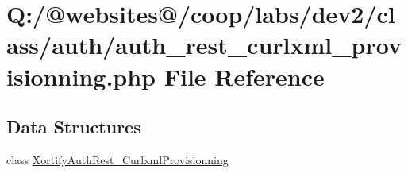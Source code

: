 \hypertarget{auth__rest__curlxml__provisionning_8php}{\section{Q\-:/@websites@/coop/labs/dev2/class/auth/auth\-\_\-rest\-\_\-curlxml\-\_\-provisionning.php File Reference}
\label{auth__rest__curlxml__provisionning_8php}
}
\subsection*{Data Structures}
\begin{DoxyCompactItemize}
\item 
class \hyperlink{class_xortify_auth_rest___curlxml_provisionning}{Xortify\-Auth\-Rest\-\_\-\-Curlxml\-Provisionning}
\end{DoxyCompactItemize}
